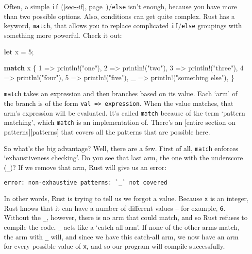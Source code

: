\documentclass[a4paper,]{book}
\renewcommand*{\hyperref}[2][\ar]{%
  \def\ar{#2}%
  #2 (\autoref{#1}, page~\pageref{#1})}
\newenvironment{Shaded}{\begin{snugshade}}{\end{snugshade}}
\newcommand{\KeywordTok}[1]{\textcolor[rgb]{0.13,0.29,0.53}{\textbf{{#1}}}}
\newcommand{\DecValTok}[1]{\textcolor[rgb]{0.00,0.00,0.81}{{#1}}}
\newcommand{\StringTok}[1]{\textcolor[rgb]{0.31,0.60,0.02}{{#1}}}
\newcommand{\OtherTok}[1]{\textcolor[rgb]{0.56,0.35,0.01}{{#1}}}
\newcommand{\NormalTok}[1]{{#1}}
\begin{document}
Often, a simple \hyperref[sec--if]{\texttt{if}}/\texttt{else} isn't
enough, because you have more than two possible options. Also,
conditions can get quite complex. Rust has a keyword, \texttt{match},
that allows you to replace complicated \texttt{if}/\texttt{else}
groupings with something more powerful. Check it out:

\begin{Shaded}
\begin{Highlighting}[]
\KeywordTok{let} \NormalTok{x = }\DecValTok{5}\NormalTok{;}

\KeywordTok{match} \NormalTok{x \{}
    \DecValTok{1} \NormalTok{=> }\OtherTok{println!}\NormalTok{(}\StringTok{"one"}\NormalTok{),}
    \DecValTok{2} \NormalTok{=> }\OtherTok{println!}\NormalTok{(}\StringTok{"two"}\NormalTok{),}
    \DecValTok{3} \NormalTok{=> }\OtherTok{println!}\NormalTok{(}\StringTok{"three"}\NormalTok{),}
    \DecValTok{4} \NormalTok{=> }\OtherTok{println!}\NormalTok{(}\StringTok{"four"}\NormalTok{),}
    \DecValTok{5} \NormalTok{=> }\OtherTok{println!}\NormalTok{(}\StringTok{"five"}\NormalTok{),}
    \NormalTok{_ => }\OtherTok{println!}\NormalTok{(}\StringTok{"something else"}\NormalTok{),}
\NormalTok{\}}
\end{Highlighting}
\end{Shaded}

\texttt{match} takes an expression and then branches based on its value.
Each `arm' of the branch is of the form
\texttt{val\ =\textgreater{}\ expression}. When the value matches, that
arm's expression will be evaluated. It's called \texttt{match} because
of the term `pattern matching', which \texttt{match} is an
implementation of. There's an {[}entire section on
patterns{]}{[}patterns{]} that covers all the patterns that are possible
here.

So what's the big advantage? Well, there are a few. First of all,
\texttt{match} enforces `exhaustiveness checking'. Do you see that last
arm, the one with the underscore (\texttt{\_})? If we remove that arm,
Rust will give us an error:

\begin{verbatim}
error: non-exhaustive patterns: `_` not covered
\end{verbatim}

In other words, Rust is trying to tell us we forgot a value. Because
\texttt{x} is an integer, Rust knows that it can have a number of
different values -- for example, \texttt{6}. Without the \texttt{\_},
however, there is no arm that could match, and so Rust refuses to
compile the code. \texttt{\_} acts like a `catch-all arm'. If none of
the other arms match, the arm with \texttt{\_} will, and since we have
this catch-all arm, we now have an arm for every possible value of
\texttt{x}, and so our program will compile successfully.
\end{document}
